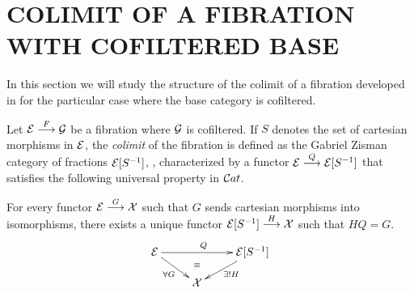 \section{COLIMIT OF A FIBRATION WITH COFILTERED BASE}
In this section we will study the structure of the colimit of a fibration  developed in \cite{sga4} for the particular case where the base category is cofiltered.

Let ${\mathcal{E} \overset {F} {\longrightarrow} \mathcal{G}}$ be a fibration where $\mathcal{G}$ is cofiltered.  If $S$ denotes the set of cartesian morphisms in $\mathcal{E}$, the \textit{colimit} of the fibration is defined as the Gabriel Zisman category of fractions 
$\mathcal{E}[S^{-1}]$, \cite{gabzis}, characterized by a functor 
${\mathcal{E} \overset {Q} {\longrightarrow} \mathcal{E}[S^{-1}]}$  that satisfies the following universal property in $\mathcal{C}at$. 

\begin{definition} \label{fractions}
For every functor ${\mathcal{E} \overset {G} {\longrightarrow} \mathcal{X}}$ such that $G$ sends cartesian morphisms into isomorphisms, there exists a unique functor 
${\mathcal{E}[S^{-1}] \overset {H} {\longrightarrow} \mathcal{X}}$ such that \mbox{$HQ=G$.}
$$
\xymatrix@R=3ex
    {
     \cc{E} \ar[dr]_{\forall G} 
            \ar[rr]^{Q} 
  && \cc{E}[S^{-1}] \ar[ld]^{\exists ! H}
 \\ 
   & \cc{X} \ar@{}[u]|(.6)\equiv  
    }		
$$
 \end{definition}

